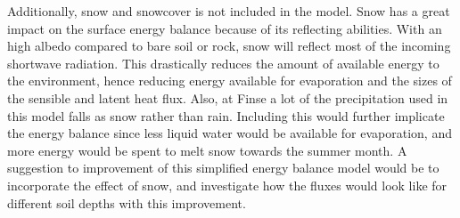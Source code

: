 \documentclass[a4paper,11pt,twocolumn]{article}
\begin{document}
Additionally, snow and snowcover is not included in the model. Snow has a great impact on the surface energy balance because of its reflecting abilities. With an high albedo compared to bare soil or rock, snow will reflect most of the incoming shortwave radiation. This drastically reduces the amount of available energy to the environment, hence reducing energy available for evaporation and the sizes of the sensible and latent heat flux. Also, at Finse a lot of the precipitation used in this model falls as snow rather than rain. Including this would further implicate the energy balance since less liquid water would be available for evaporation, and more energy would be spent to melt snow towards the summer month. A suggestion to improvement of this simplified energy balance model would be to incorporate the effect of snow, and investigate how the fluxes would look like for different soil depths with this improvement.     

\end{document}
